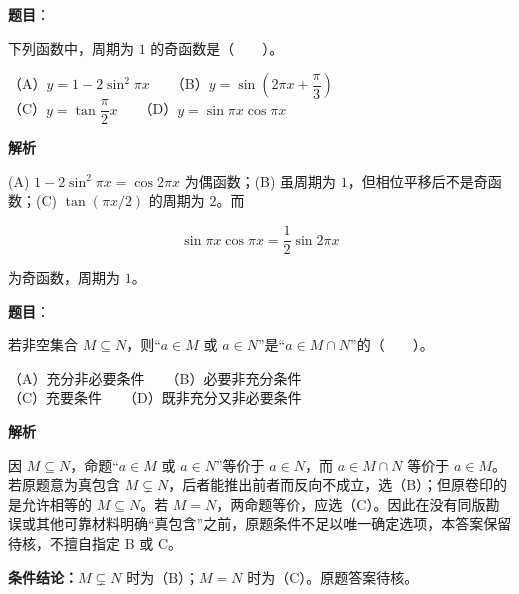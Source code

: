 \begin{answer}

\textbf{题目}：

下列函数中，周期为 $1$ 的奇函数是\mbox{（　　）}。

（A）$y=1-2\sin^2\pi x$　　（B）$y=\sin\left(2\pi x+\dfrac{\pi}{3}\right)$\\
（C）$y=\tan\dfrac{\pi}{2}x$　　（D）$y=\sin\pi x\cos\pi x$

\textbf{解析}

(A) $1-2\sin^2\pi x=\cos2\pi x$ 为偶函数；(B) 虽周期为 $1$，但相位平移后不是奇函数；(C) $\tan(\pi x/2)$ 的周期为 $2$。而

\nopagebreak[4]
\[\sin\pi x\cos\pi x=\frac12\sin2\pi x\]

为奇函数，周期为 $1$。


\end{answer}
\begin{answer}

\textbf{题目}：

若非空集合 $M\subseteq N$，则“$a\in M$ 或 $a\in N$”是“$a\in M\cap N$”的\mbox{（　　）}。

（A）充分非必要条件　　（B）必要非充分条件\\
（C）充要条件　　（D）既非充分又非必要条件

\textbf{解析}

因 $M\subseteq N$，命题“$a\in M$ 或 $a\in N$”等价于 $a\in N$，而 $a\in M\cap N$ 等价于 $a\in M$。若原题意为真包含 $M\subsetneq N$，后者能推出前者而反向不成立，选（B）；但原卷印的是允许相等的 $M\subseteq N$。若 $M=N$，两命题等价，应选（C）。因此在没有同版勘误或其他可靠材料明确“真包含”之前，原题条件不足以唯一确定选项，本答案保留待核，不擅自指定 B 或 C。

\textbf{条件结论：}$M\subsetneq N$ 时为（B）；$M=N$ 时为（C）。原题答案待核。


\end{answer}

